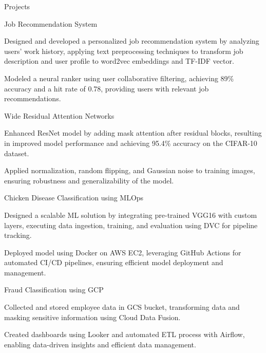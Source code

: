 \documentclass{resume}
\begin{document}
\begin{rSection}{Projects}
    \begin{rSubsectionProj}{Job Recommendation System}

    \vspace{-3pt}
\item Designed and developed a personalized job recommendation system by analyzing users' work history, applying text preprocessing techniques to transform job description and user profile to word2vec embeddings and TF-IDF vector.
\vspace{-3pt}
\item Modeled a neural ranker using user collaborative filtering, achieving 89\% accuracy and a hit rate of 0.78, providing users with relevant job recommendations.
\end{rSubsectionProj}
\vspace{-3pt}

    \begin{rSubsectionProj}{Wide Residual Attention Networks}

    \vspace{-3pt}
\item Enhanced ResNet model by adding mask attention after residual blocks, resulting in improved model performance and achieving 95.4\% accuracy on the CIFAR-10 dataset.
\vspace{-3pt}
\item Applied normalization, random flipping, and Gaussian noise to training images, ensuring robustness and generalizability of the model.
\end{rSubsectionProj}
\vspace{-3pt}

    \begin{rSubsectionProj}{Chicken Disease Classification using MLOps}

    \vspace{-3pt}
\item Designed a scalable ML solution by integrating pre-trained VGG16 with custom layers, executing data ingestion, training, and evaluation using DVC for pipeline tracking.
\vspace{-3pt}
\item Deployed model using Docker on AWS EC2, leveraging GitHub Actions for automated CI/CD pipelines, ensuring efficient model deployment and management.
\end{rSubsectionProj}
\vspace{-3pt}

    \begin{rSubsectionProj}{Fraud Classification using GCP}

    \vspace{-3pt}
\item Collected and stored employee data in GCS bucket, transforming data and masking sensitive information using Cloud Data Fusion.
\vspace{-3pt}
\item Created dashboards using Looker and automated ETL process with Airflow, enabling data-driven insights and efficient data management.
\end{rSubsectionProj}
\end{rSection}
\end{document}
